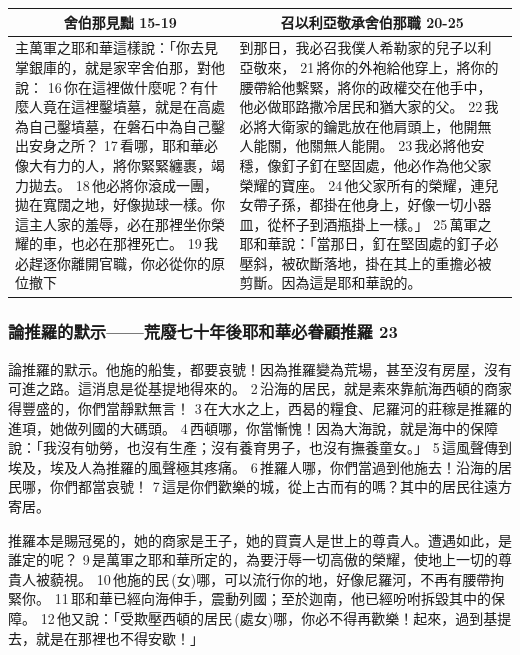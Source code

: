 \begin{table}[H]
\centering
\begin{tabular}{p{7.75cm}|p{9.50cm}}\hline\hline
\multicolumn{1}{c|}{舍伯那見黜 15-19}&\multicolumn{1}{c}{召以利亞敬承舍伯那職 20-25}\\\hline
主萬軍之耶和華這樣說：「你去見掌銀庫的，就是家宰舍伯那，對他說： 16 你在這裡做什麼呢？有什麼人竟在這裡鑿墳墓，就是在高處為自己鑿墳墓，在磐石中為自己鑿出安身之所？ 17 看哪，耶和華必像大有力的人，將你緊緊纏裹，竭力拋去。 18 他必將你滾成一團，拋在寬闊之地，好像拋球一樣。你這主人家的羞辱，必在那裡坐你榮耀的車，也必在那裡死亡。 19 我必趕逐你離開官職，你必從你的原位撤下
&到那日，我必召我僕人希勒家的兒子以利亞敬來， 21 將你的外袍給他穿上，將你的腰帶給他繫緊，將你的政權交在他手中，他必做耶路撒冷居民和猶大家的父。 22 我必將大衛家的鑰匙放在他肩頭上，他開無人能關，他關無人能開。 23 我必將他安穩，像釘子釘在堅固處，他必作為他父家榮耀的寶座。 24 他父家所有的榮耀，連兒女帶子孫，都掛在他身上，好像一切小器皿，從杯子到酒瓶掛上一樣。」 25 萬軍之耶和華說：「當那日，釘在堅固處的釘子必壓斜，被砍斷落地，掛在其上的重擔必被剪斷。因為這是耶和華說的。\\\hline
\end{tabular}
\end{table}





\subsubsection{論推羅的默示——荒廢七十年後耶和華必眷顧推羅 23}
論推羅的默示。他施的船隻，都要哀號！因為推羅變為荒場，甚至沒有房屋，沒有可進之路。這消息是從基提地得來的。 2 沿海的居民，就是素來靠航海西頓的商家得豐盛的，你們當靜默無言！ 3 在大水之上，西曷的糧食、尼羅河的莊稼是推羅的進項，她做列國的大碼頭。 4 西頓哪，你當慚愧！因為大海說，就是海中的保障說：「我沒有劬勞，也沒有生產；沒有養育男子，也沒有撫養童女。」 5 這風聲傳到埃及，埃及人為推羅的風聲極其疼痛。 6 推羅人哪，你們當過到他施去！沿海的居民哪，你們都當哀號！ 7 這是你們歡樂的城，從上古而有的嗎？其中的居民往遠方寄居。

推羅本是賜冠冕的，她的商家是王子，她的買賣人是世上的尊貴人。遭遇如此，是誰定的呢？ 9 是萬軍之耶和華所定的，為要汙辱一切高傲的榮耀，使地上一切的尊貴人被藐視。 10 他施的民 (女)哪，可以流行你的地，好像尼羅河，不再有腰帶拘緊你。 11 耶和華已經向海伸手，震動列國；至於迦南，他已經吩咐拆毀其中的保障。 12 他又說：「受欺壓西頓的居民 (處女)哪，你必不得再歡樂！起來，過到基提去，就是在那裡也不得安歇！」

